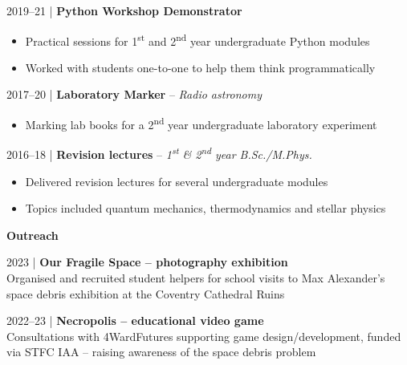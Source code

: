 \documentclass[10pt,a4paper]{altacv}
\begin{document}
\smallskip

\small 2019--21 | \textbf{Python Workshop Demonstrator} \\
\smallskip
\begin{itemize}
	\item Practical sessions for 1\textsuperscript{st} and 2\textsuperscript{nd} year undergraduate Python modules
	\item Worked with students one-to-one to help them think programmatically
\end{itemize}

\smallskip

\small 2017--20 | \textbf{Laboratory Marker} -- \textit{Radio astronomy} \\
\smallskip
\begin{itemize}
	\item Marking lab books for a 2\textsuperscript{nd} year undergraduate laboratory experiment
\end{itemize}

\smallskip

\small 2016--18 | \textbf{Revision lectures} -- \textit{1\textsuperscript{st} \& 2\textsuperscript{nd} year B.Sc./M.Phys.} \\
\smallskip
\begin{itemize}
	\item Delivered revision lectures for several undergraduate modules
	\item Topics included quantum mechanics, thermodynamics and stellar physics
\end{itemize}

\divider


\normalsize \textbf{Outreach}

\medskip

\small 2023 | \textbf{Our Fragile Space -- photography exhibition} \\
\smallskip
Organised and recruited student helpers for school visits to Max Alexander's space debris exhibition at the Coventry Cathedral Ruins

\smallskip

\small 2022--23 | \textbf{Necropolis -- educational video game} \\
\smallskip
Consultations with 4WardFutures supporting game design/development, funded via STFC IAA -- raising awareness of the space debris problem

\smallskip

\end{document}

